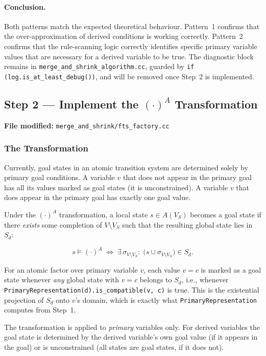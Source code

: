\documentclass[11pt,a4paper]{article}
\begin{document}
\paragraph{Conclusion.}
Both patterns match the expected theoretical behaviour.  Pattern~1 confirms
that the over-approximation of derived conditions is working correctly.
Pattern~2 confirms that the rule-scanning logic correctly identifies specific
primary variable values that are necessary for a derived variable to be true.
The diagnostic block remains in \texttt{merge\_and\_shrink\_algorithm.cc},
guarded by \texttt{if (log.is\_at\_least\_debug())}, and will be removed
once Step~2 is implemented.

\subsection{Step 2 — Implement the $(\cdot)^A$ Transformation}
\textbf{File modified:} \texttt{merge\_and\_shrink/fts\_factory.cc}

\subsubsection{The Transformation}

Currently, goal states in an atomic transition system are determined solely by
primary goal conditions.  A variable $v$ that does not appear in the primary
goal has all its values marked as goal states (it is unconstrained).  A
variable $v$ that does appear in the primary goal has exactly one goal value.

Under the $(\cdot)^A$ transformation, a local state $s \in A(V_S)$ becomes a
goal state if there \emph{exists} some completion of $V \setminus V_S$ such
that the resulting global state lies in $S_d$:

\[
  s \models (\cdot)^A
  \;\iff\;
  \exists\, \sigma_{V \setminus V_S} :\;
  \bigl(s \cup \sigma_{V \setminus V_S}\bigr) \in S_d.
\]

For an atomic factor over primary variable $v$, each value $v = c$ is marked
as a goal state whenever \emph{any} global state with $v = c$ belongs to
$S_d$, i.e., whenever \texttt{PrimaryRepresentation(d).is\_compatible(v, c)}
is true.  This is the existential projection of $S_d$ onto $v$'s domain,
which is exactly what \texttt{PrimaryRepresentation} computes from Step~1.

The transformation is applied to \emph{primary} variables only.  For derived
variables the goal state is determined by the derived variable's own goal
value (if it appears in the goal) or is unconstrained (all states are goal
states, if it does not).
\end{document}
